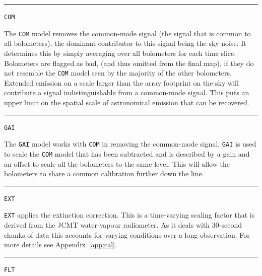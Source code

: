 \documentclass[twoside,11pt]{article}
\newcommand{\htmlref}[2]{#1}
\newcommand{\latexhtml}[2]{#1}
\renewcommand{\_}{\texttt{\symbol{95}}}
\newcommand{\cref}[3]{\latexhtml{#1~\ref{#2}}{\htmlref{#3}{#2}}}
\begin{document}
\hrule
\begin{minipage}[t]{0.12\linewidth}
\centering\texttt{COM}
\end{minipage}
\begin{minipage}[t]{0.88\linewidth}The \texttt{COM} model removes the
common-mode signal (the signal that is common to all bolometers), the
dominant contributor to this signal being the sky noise. It determines
this by simply averaging over all bolometers for each time slice.
Bolometers are flagged as bad, (and thus omitted from the final map), if
they do not resemble the \texttt{COM} model seen by the majority of the
other bolometers.
\newline Extended emission on a scale larger than the array footprint
on the sky will contribute a signal indistinguishable from a
common-mode signal. This puts an upper limit on the spatial scale of
astronomical emission that can be recovered. \\
\end{minipage}
\hrule
\vspace{0.1cm}
\begin{minipage}[t]{0.12\linewidth}
\centering\texttt{GAI}
\end{minipage}
\begin{minipage}[t]{0.88\linewidth}The \texttt{GAI} model works with
\texttt{COM} in removing the common-mode signal. \texttt{GAI} is used to
scale the \texttt{COM} model that has been subtracted and is described by
a gain and an offset to scale all the bolometers to the same level. This
will allow the bolometers to share a common calibration further down the
line. \\
\end{minipage}
\hrule
\vspace{0.1cm}
\begin{minipage}[t]{0.12\linewidth}
\centering\texttt{EXT}
\end{minipage}
\begin{minipage}[t]{0.88\linewidth}\texttt{EXT} applies the extinction
correction. This is a time-varying scaling factor that is derived from
the JCMT water-vapour radiometer. As it deals with 30-second chunks of
data this accounts for varying conditions over a long observation. For
more details see \cref{Appendix}{app:cal}{SCUBA-2 data calibration}. \\
\end{minipage}
\hrule
\vspace{0.1cm}
\begin{minipage}[t]{0.12\linewidth}
\centering\texttt{FLT}
\end{minipage}
\end{document}
